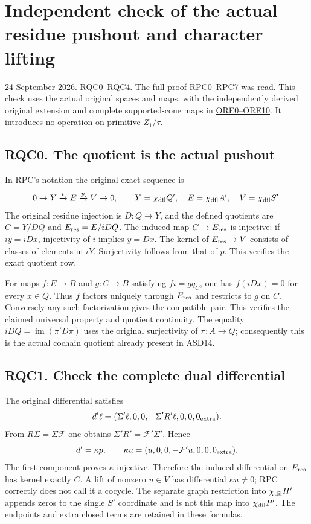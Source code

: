 \section{Independent check of the actual residue pushout and character
lifting}\label{independent-check-of-the-actual-residue-pushout-and-character-lifting}

24 September 2026. RQC0--RQC4. The full proof
\href{ACTUAL_RESIDUE_PUSHOUT_AND_CHARACTER_LIFTING.md}{RPC0--RPC7} was
read. This check uses the actual original spaces and maps, with the
independently derived original extension and complete supported-cone
maps in
\href{ORIGINAL_RESTRICTION_EXTENSION_AND_DELIGNE_CROSS.md}{ORE0--ORE10}.
It introduces no operation on primitive \(Z_1/\tau\).

\subsection{RQC0. The quotient is the actual
pushout}\label{rqc0.-the-quotient-is-the-actual-pushout}

In RPC's notation the original exact sequence is \[
0\to Y\xrightarrow{i}E\xrightarrow{p}V\to0,\qquad
Y=\chi_{\rm dil}Q',\quad E=\chi_{\rm dil}A',\quad
V=\chi_{\rm dil}S'.
\] The original residue injection is \(D:Q\to Y\), and the defined
quotients are \(C=Y/DQ\) and \(E_{\rm res}=E/iDQ\). The induced map
\(C\to E_{\rm res}\) is injective: if \(iy=iDx\), injectivity of \(i\)
implies \(y=Dx\). The kernel of \(E_{\rm res}\to V\) consists of classes
of elements in \(iY\). Surjectivity follows from that of \(p\). This
verifies the exact quotient row.

For maps \(f:E\to B\) and \(g:C\to B\) satisfying \(fi=gq_C\), one has
\(f(iDx)=0\) for every \(x\in Q\). Thus \(f\) factors uniquely through
\(E_{\rm res}\) and restricts to \(g\) on \(C\). Conversely any such
factorization gives the compatible pair. This verifies the claimed
universal property and quotient continuity. The equality
\(iDQ=\operatorname{im}(\pi'D\pi)\) uses the original surjectivity of
\(\pi:A\to Q\); consequently this is the actual cochain quotient already
present in ASD14.

\subsection{RQC1. Check the complete dual
differential}\label{rqc1.-check-the-complete-dual-differential}

The original differential satisfies \[
d'\ell=(\Sigma'\ell,0,0,-\Sigma'R'\ell,0,0,0_{\rm extra}).
\] From \(R\Sigma=\Sigma\mathcal F\) one obtains
\(\Sigma'R'=\mathcal F'\Sigma'\). Hence \[
d'=\kappa p,\qquad
\kappa u=(u,0,0,-\mathcal F'u,0,0,0_{\rm extra}).
\] The first component proves \(\kappa\) injective. Therefore the
induced differential on \(E_{\rm res}\) has kernel exactly \(C\). A lift
of nonzero \(u\in V\) has differential \(\kappa u\ne0\); RPC correctly
does not call it a cocycle. The separate graph restriction into
\(\chi_{\rm dil}H'\) appends zeros to the single \(S'\) coordinate and
is not this map into \(\chi_{\rm dil}P'\). The endpoints and extra
closed terms are retained in these formulas.


